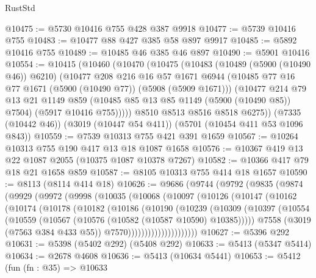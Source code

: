 \begin{lexlean}{RustStd}
\begin{coremodule}
@10475 := @5730 @10416 @755 @428 @387 @9918
@10477 := @5739 @10416 @755
@10483 := @10477 @88 @427 @385 @58 @897 @9917
@10485 := @5892 @10416 @755
@10489 := @10485 @46 @385 @46 @897
@10490 := @5901 @10416
@10554 := @10415
    (@10460
      (@10470
        (@10475
          (@10483
            (@10489 (@5900 (@10490 @46)) @6210)
            (@10477
              @208
              @216
              @16
              @57
              @1671
              @6944
              (@10485 @77 @16 @77 @1671 (@5900 (@10490 @77)) (@5908 (@5909 @1671)))
              (@10477
                @214
                @79
                @13
                @21
                @1149
                @859
                (@10485 @85 @13 @85 @1149 (@5900 (@10490 @85)) @7504)
                (@5917 @10416 @755)))))
        @8510
        @8513
        @8516
        @8518
        @6275))
    (@7335 (@10442 @46))
    (@3019 (@10447 @54 @411))
    (@5701 (@10454 @411 @53 @1096 @843))
@10559 := @7539 @10313 @755 @421 @391 @1659
@10567 := @10264 @10313 @755 @190 @417 @13 @18 @1087 @1658
@10576 := @10367 @419 @13 @22 @1087 @2055 (@10375 @1087 @10378 @7267)
@10582 := @10366 @417 @79 @18 @21 @1658 @859
@10587 := @8105 @10313 @755 @414 @18 @1657
@10590 := @8113 (@8114 @414 @18)
@10626 := @9686
    (@9744
      (@9792
        (@9835
          (@9874
            (@9929
              (@9972
                (@9998
                  (@10035
                    (@10068
                      (@10097
                        (@10126
                          (@10147
                            (@10162
                              (@10174
                                (@10178
                                  (@10182
                                    (@10186
                                      (@10190
                                        (@10239
                                          (@10309
                                            (@10397
                                              (@10554
                                                (@10559
                                                  (@10567
                                                    (@10576 (@10582 (@10587 @10590) @10385)))))
                                              @7558
                                              (@3019 (@7563 @384 @433 @55))
                                              @7570)))))))))))))))))))))
@10627 := @5396 @292
@10631 := @5398 (@5402 @292) (@5408 @292)
@10633 := @5413 (@5347 @5414)
@10634 := @2678 @4608
@10636 := @5413 (@10634 @5441)
@10653 := @5412
    (fun (fn : @35) =>
    @10633

\end{coremodule}
\end{lexlean}
